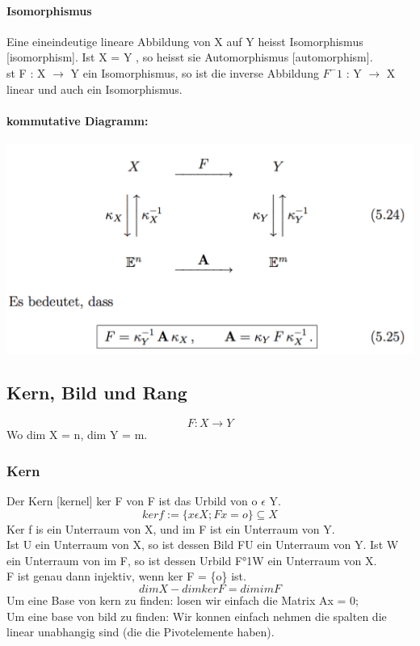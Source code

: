 \documentclass[11pt]{article}
\newcommand\back[1][-3cm]{\hspace*{#1}}
\begin{document}
\paragraph{Isomorphismus}
Eine eineindeutige lineare Abbildung von X auf Y heisst Isomorphismus [isomorphism]. Ist X = Y , so heisst sie Automorphismus [automorphism].\\
st F : X $\rightarrow$ Y ein Isomorphismus, so ist die inverse Abbildung $F^-1$ : Y $\rightarrow$ X linear und auch ein Isomorphismus.
\paragraph{kommutative Diagramm:}
\back\includegraphics{images/diagram}
\subsection{Kern, Bild und Rang}
\begin{equation}
	F:X\rightarrow Y
\end{equation}
Wo dim X = n, dim Y = m.
\subsubsection{Kern}
Der Kern [kernel] ker F von F ist das Urbild von o $\epsilon$ Y.
\begin{equation}
	ker f := \{x \epsilon X; Fx = o \} \subseteq X
\end{equation}
Ker f is ein Unterraum von X, und im F ist ein Unterraum von Y.\\
Ist U ein Unterraum von X, so ist dessen Bild FU ein Unterraum von Y. Ist W ein Unterraum von im F, so ist dessen Urbild F°1W ein Unterraum von X.\\
F ist genau dann injektiv, wenn ker F = \{o\} ist.
\begin{equation}
	dimX - dim ker F = dim im F
\end{equation}
Um eine Base von kern zu finden: losen wir einfach die Matrix Ax = 0;\\
Um eine base von bild zu finden: Wir konnen einfach nehmen die spalten die linear unabhangig sind (die die Pivotelemente haben).
\end{document}
